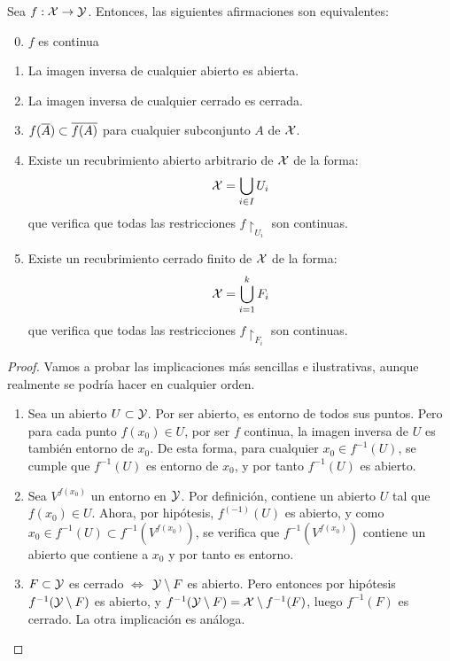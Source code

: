 \begin{prop}
	Sea $f:\mathcal{X}\to\mathcal{Y}$. Entonces, las siguientes afirmaciones son equivalentes:
	
	\begin{enumerate}
		\setcounter{enumi}{-1}
		\item $f$ es continua
		\item La imagen inversa de cualquier abierto es abierta.
		\item La imagen inversa de cualquier cerrado es cerrada.
		\item $f(\overline{A})\subset\overline{f(A)}$ para cualquier subconjunto $A$ de $\mathcal{X}$.
		\item Existe un recubrimiento abierto arbitrario de $\mathcal{X}$ de la forma:
			\[\mathcal{X}=\bigcup\limits_{i\in I} U_i\]
			que verifica que todas las restricciones $f\restriction_{U_i}$ son continuas.
		\item Existe un recubrimiento cerrado finito de $\mathcal{X}$ de la forma:
			\[\mathcal{X}=\bigcup\limits_{i=1}^k F_i\]
			que verifica que todas las restricciones $f\restriction_{F_i}$ son continuas.
	\end{enumerate}

	\begin{proof}
		Vamos a probar las implicaciones más sencillas e ilustrativas, aunque realmente se podría hacer en cualquier orden. 
		
		\begin{enumerate}[align=left, leftmargin=*]
			\item[\fbox{$(0)\implies (1)$}] Sea un abierto $U\subset\mathcal{Y}$. Por ser abierto, es entorno de todos sus puntos. Pero para cada punto $f(x_0)\in U$, por ser $f$ continua, la imagen inversa de $U$ es también entorno de $x_0$. De esta forma, para cualquier $x_0\in f^{-1}(U)$, se cumple que $f^{-1}(U)$ es entorno de $x_0$, y por tanto $f^{-1}(U)$ es abierto.
			
			\item[\fbox{$(1)\implies (0)$}] Sea $V^{f(x_0)}$ un entorno en $\mathcal{Y}$. Por definición, contiene un abierto $U$ tal que $f(x_0)\in U$. Ahora, por hipótesis, $f^(-1)(U)$ es abierto, y como $x_0\in f^{-1}(U)\subset f^{-1}(V^{f(x_0)})$, se verifica que $f^{-1}(V^{f(x_0)})$ contiene un abierto que contiene a $x_0$ y por tanto es entorno.
			
			\item[\fbox{$(1)\Longleftrightarrow (2)$}] $F\subset\mathcal{Y}$ es cerrado $\iff$ $\mathcal{Y}\setminus F$ es abierto. Pero entonces por hipótesis $f^{-1}(\mathcal{Y}\setminus F)$ es abierto, y $f^{-1}(\mathcal{Y}\setminus F)=\mathcal{X}\setminus f^{-1}(F)$, luego $f^{-1}(F)$ es cerrado. La otra implicación es análoga.
			

\end{enumerate}
\end{proof}
\end{prop}
